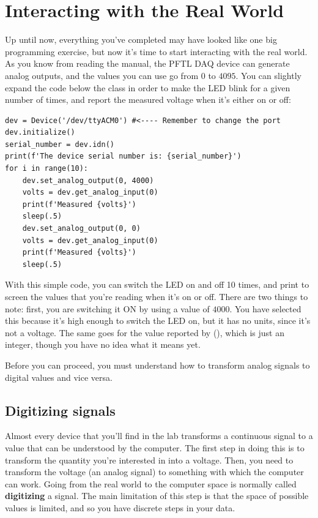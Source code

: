\section{Interacting with the Real World}\label{sec:doing-something-in-theemph}
Up until now, everything you've completed may have looked like one big programming exercise, but now it's time to start interacting with the real world. As you know from reading the manual, the {PFTL DAQ} device can generate analog outputs, and the values you can use go from $0$ to $4095$. You can slightly expand the code below the class in order to make the LED blink for a given number of times, and report the measured voltage when it's either on or off:

\begin{verbatim}
dev = Device('/dev/ttyACM0') #<---- Remember to change the port
dev.initialize()
serial_number = dev.idn()
print(f'The device serial number is: {serial_number}')
for i in range(10):
    dev.set_analog_output(0, 4000)
    volts = dev.get_analog_input(0)
    print(f'Measured {volts}')
    sleep(.5)
    dev.set_analog_output(0, 0)
    volts = dev.get_analog_input(0)
    print(f'Measured {volts}')
    sleep(.5)
\end{verbatim}

With this simple code, you can switch the LED on and off 10 times, and print to screen the values that you're reading when it's on or off. There are two things to note: first, you are switching it ON by using a value of $4000$. You have selected this because it's high enough to switch the LED on, but it has no units, since it's not a voltage. The same goes for the value reported by (), which is just an integer, though you have no idea what it means yet.

Before you can proceed, you must understand how to transform analog signals to digital values and vice versa.

\subsection{Digitizing signals}\label{subsec:adc-dca}
Almost every device that you'll find in the lab transforms a continuous signal to a value that can be understood by the computer. The first step in doing this is to transform the quantity you're interested in into a voltage. Then, you need to transform the voltage (an analog signal) to something with which the computer can work. Going from the real world to the computer space is normally called \textbf{digitizing} a signal. The main limitation of this step is that the space of possible values is limited, and so you have discrete steps in your data.

